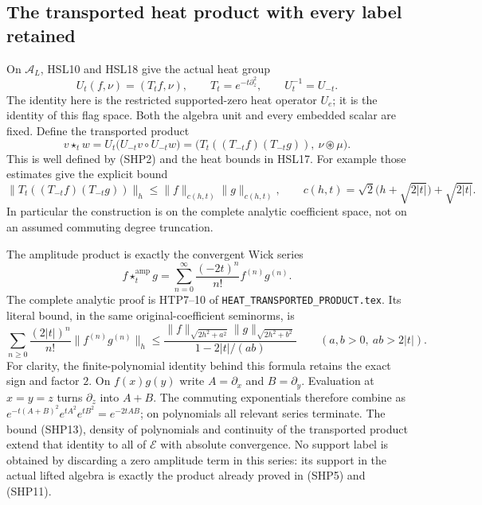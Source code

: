 \subsection{The transported heat product with every label retained}

On $\mathcal A_L$, HSL10 and HSL18 give the actual heat group
\[
 U_t(f,\nu)=(T_tf,\nu),\qquad
 T_t=e^{-t\partial_z^2},\qquad U_t^{-1}=U_{-t}.
\]
The identity here is the restricted supported-zero heat
operator $U_e$; it is the identity of this flag space.
Both the algebra unit and every embedded scalar are fixed.
Define the transported product
\begin{equation}\tag{SHP11}
 v\star_t w=
 U_t\bigl(U_{-t}v\circ U_{-t}w\bigr)
   =\bigl(T_t((T_{-t}f)(T_{-t}g)),\
                         \nu\circledast\mu\bigr).
\end{equation}
This is well defined by (SHP2) and the heat bounds in HSL17.
For example those estimates give the explicit bound
\[
 \|T_t((T_{-t}f)(T_{-t}g))\|_h
 \le\|f\|_{c(h,t)}\|g\|_{c(h,t)},\qquad
 c(h,t)=\sqrt2\bigl(h+\sqrt{2|t|}\bigr)+\sqrt{2|t|}.
\]
In particular the construction is on the complete analytic
coefficient space, not on an assumed commuting degree
truncation.

The amplitude product is exactly the convergent Wick series
\begin{equation}\tag{SHP12}
 f\star_t^{\mathrm{amp}}g
     =\sum_{n=0}^{\infty}
          \frac{(-2t)^n}{n!}f^{(n)}g^{(n)} .
\end{equation}
The complete analytic proof is HTP7--10 of
\nolinkurl{HEAT_TRANSPORTED_PRODUCT.tex}. Its literal bound,
in the same original-coefficient seminorms, is
\begin{equation}\tag{SHP13}
 \sum_{n\ge0}\frac{(2|t|)^n}{n!}
       \|f^{(n)}g^{(n)}\|_h
 \le
 \frac{\|f\|_{\sqrt{2h^2+a^2}}
       \|g\|_{\sqrt{2h^2+b^2}}}
      {1-2|t|/(ab)}
        \qquad(a,b>0,\ ab>2|t|).
\end{equation}
For clarity, the finite-polynomial identity behind this
formula retains the exact sign and factor $2$.
On $f(x)g(y)$ write $A=\partial_x$ and $B=\partial_y$.
Evaluation at $x=y=z$ turns $\partial_z$ into $A+B$.
The commuting exponentials therefore combine as
$e^{-t(A+B)^2}e^{tA^2}e^{tB^2}=e^{-2tAB}$;
on polynomials all relevant series terminate.
The bound (SHP13), density of polynomials and continuity
of the transported product extend that identity to
all of $\mathcal E$ with absolute convergence.
No support label is obtained by discarding a zero
amplitude term in this series: its support in the
actual lifted algebra is exactly the product already
proved in (SHP5) and (SHP11).

